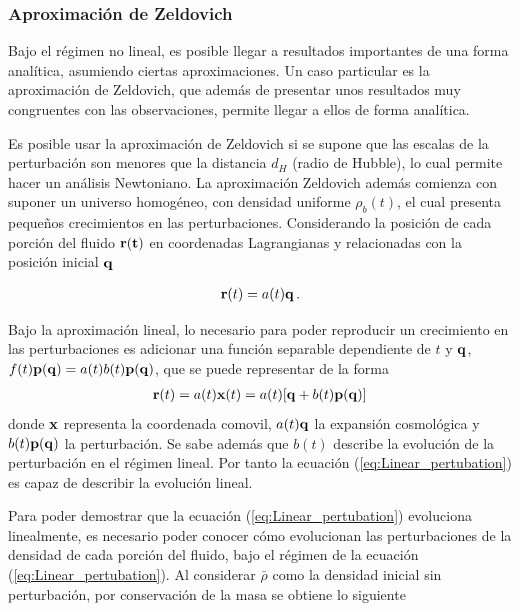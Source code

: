 

	\subsubsection{Aproximación de Zeldovich}
	\label{subsubsec:Zeldovich_Aproximation}

Bajo el régimen no lineal, es posible llegar a resultados importantes de una forma analítica, asumiendo ciertas aproximaciones. Un caso particular es la aproximación de Zeldovich, que además de presentar unos resultados muy congruentes con las observaciones, permite llegar a ellos de forma analítica. 

Es posible usar la aproximación de Zeldovich si se supone que las escalas de la perturbación son menores que la distancia $d_{H}$ (radio de Hubble), lo cual permite hacer un análisis Newtoniano. La aproximación Zeldovich además comienza con suponer un universo homogéneo, con densidad uniforme $\rho_{b}(t)$, el  cual presenta pequeños crecimientos en las perturbaciones. Considerando la posición de cada porción del fluido $\bf{r}(t)$ en coordenadas Lagrangianas y relacionadas con la posición inicial $\bf{q}$

\begin{align}
{\bf{r}}(t)=a(t){\bf{q}}\,.
\end{align}

Bajo la aproximación lineal, lo necesario para poder reproducir un crecimiento en las perturbaciones es adicionar una función separable dependiente de $t$ y $\bf{q}$, $f(t){\bf{p}}({\bf{q}})=a(t)b(t){\bf{p}(\bf{q})}$, que se puede representar de la forma 
%
\begin{align}
{\bf{r}}(t)=a(t){\bf{x}}(t)=a(t)[{\bf{q}}+b(t){\bf{p(q)}}]
\label{eq:Linear_pertubation}
\end{align}
%
donde ${\bf{x}}$ representa la coordenada comovil, $a(t){\bf{q}}$  la expansión cosmológica y $b(t){\bf{p(q)}}$ la perturbación. Se sabe además que $b(t)$ describe la evolución de la perturbación en el régimen lineal. Por tanto la ecuación (\ref{eq:Linear_pertubation}) es capaz de describir la evolución lineal.

Para poder demostrar que la ecuación (\ref{eq:Linear_pertubation})  evoluciona linealmente, es necesario poder conocer cómo evolucionan las perturbaciones de la densidad de cada porción del fluido, bajo el régimen de la ecuación (\ref{eq:Linear_pertubation}). Al considerar $\bar{\rho}$ como la densidad inicial sin perturbación, por conservación de la masa se obtiene lo siguiente

